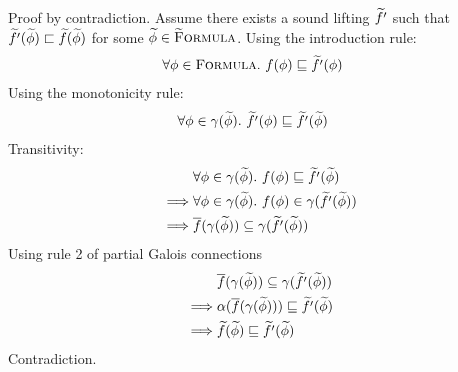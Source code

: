 \begin{proofatend}
\begin{description}
        Proof by contradiction.
        Assume there exists a sound lifting $\widetilde{f'}$ such that $\widetilde{f'}(\widetilde{\phi}) \sqsubset \widetilde{f}(\widetilde{\phi})$ for some $\widetilde{\phi} \in \textup{\textsc{\ensuremath{\widetilde{\text{F}}}ormula}}$.
        Using the introduction rule:
        \begin{align*}
        &\forall \phi \in \textup{\textsc{Formula}}.~ f(\phi) \sqsubseteq \widetilde{f'}(\phi)
        \end{align*}
        Using the monotonicity rule:
        \begin{align*}
        &\forall \phi \in \gamma(\widetilde{\phi}).~ \widetilde{f'}(\phi) \sqsubseteq \widetilde{f'}(\widetilde{\phi})
        \end{align*}
        Transitivity:
        \begin{align*}
        &\forall \phi \in \gamma(\widetilde{\phi}).~ f(\phi) \sqsubseteq \widetilde{f'}(\widetilde{\phi})\\
        \implies
        &\forall \phi \in \gamma(\widetilde{\phi}).~ f(\phi) \in \gamma(\widetilde{f'}(\widetilde{\phi}))\\
        \implies
        &\overline{f}(\gamma(\widetilde{\phi})) \subseteq \gamma(\widetilde{f'}(\widetilde{\phi}))\\
        \end{align*}
        Using rule 2 of partial Galois connections
        \begin{align*}
        &\overline{f}(\gamma(\widetilde{\phi})) \subseteq \gamma(\widetilde{f'}(\widetilde{\phi}))\\
        \implies
        &\alpha(\overline{f}(\gamma(\widetilde{\phi}))) \sqsubseteq \widetilde{f'}(\widetilde{\phi})\\
        \implies
        &\widetilde{f}(\widetilde{\phi}) \sqsubseteq \widetilde{f'}(\widetilde{\phi})\\
        \end{align*}
        Contradiction.
    \end{description}       
\end{proofatend}

